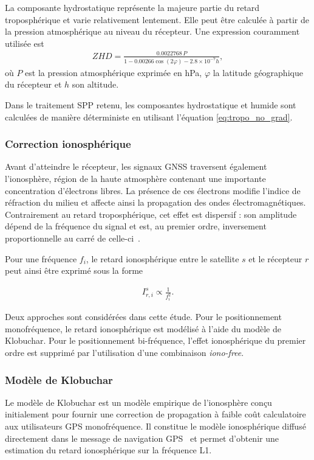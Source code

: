 La composante hydrostatique représente la majeure partie du retard
troposphérique et varie relativement lentement. Elle peut être calculée à
partir de la pression atmosphérique au niveau du récepteur. Une expression
couramment utilisée est
\begin{align}
ZHD
=
\frac{0.0022768\,P}
{1-0.00266\cos(2\varphi)-2.8\times10^{-7}h},
\label{eq:zhd}
\end{align}
où $P$ est la pression atmosphérique exprimée en hPa, $\varphi$ la latitude
géographique du récepteur et $h$ son altitude.

Dans le traitement SPP retenu, les composantes hydrostatique et humide sont
calculées de manière déterministe en utilisant l'équation \ref{eq:tropo_no_grad}. 

\subsubsection{Correction ionosphérique}

Avant d'atteindre le récepteur, les signaux GNSS traversent également
l'ionosphère, région de la haute atmosphère contenant une importante
concentration d'électrons libres. La présence de ces électrons modifie
l'indice de réfraction du milieu et affecte ainsi la propagation des ondes
électromagnétiques. Contrairement au retard troposphérique, cet effet est
dispersif : son amplitude dépend de la fréquence du signal et est, au
premier ordre, inversement proportionnelle au carré de celle-ci~\cite{hauschild2017observations}.

Pour une fréquence $f_i$, le retard ionosphérique entre le satellite $s$ et le
récepteur $r$ peut
ainsi être exprimé sous la forme

\begin{align}
I_{r,i}^s
\propto
\frac{1}{f_i^2}.
\end{align}

Deux approches sont considérées dans cette étude. Pour le positionnement
monofréquence, le retard ionosphérique est modélisé à l'aide du modèle de
Klobuchar. Pour le positionnement bi-fréquence, l'effet ionosphérique du
premier ordre est supprimé par l'utilisation d'une combinaison
\textit{iono-free}.

\subsubsection{Modèle de Klobuchar}

Le modèle de Klobuchar est un modèle empirique de l'ionosphère conçu
initialement pour fournir une correction de propagation à faible coût
calculatoire aux utilisateurs GPS monofréquence. Il constitue le modèle
ionosphérique diffusé directement dans le message de navigation GPS~\cite{klobuchar1987} et
permet d'obtenir une estimation du retard ionosphérique sur la fréquence
L1.

